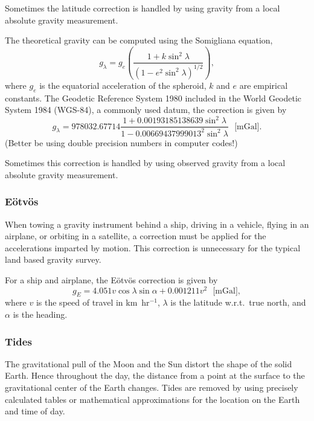 Sometimes the latitude correction is handled by using gravity from a local absolute gravity measurement.

The theoretical gravity can be computed using the Somigliana equation,
\begin{equation}
    g_{\lambda} = g_{e} \left( 
    \frac{1 + k \sin^{2} \lambda}{(1 - e^{2} \sin^{2} \lambda)^{1/2}} \right),
\end{equation}
where $g_{e}$ is the equatorial acceleration of the spheroid, $k$ and $e$ are empirical constants.  The Geodetic Reference System 1980 included in the World Geodetic System 1984 (WGS-84), a commonly used datum, the correction is given by
\begin{equation}
    g_{\lambda} = 978032.67714
    \frac{1 + 0.00193185138639 \sin^{2} \lambda}
    {1 - 0.00669437999013^2 \sin^{2} \lambda} \mbox{ $[$mGal$]$}.
\end{equation}
(Better be using double precision numbers in computer codes!)

Sometimes this correction is handled by using observed gravity from a local absolute gravity measurement.

\subsubsection{E{\"o}tv{\"o}s}
When towing a gravity instrument behind a ship, driving in a vehicle, flying in an airplane, or orbiting in a satellite, a correction must be applied for the accelerations imparted by motion.  This correction is unnecessary for the typical land based gravity survey.

For a ship and airplane, the E{\"o}tv{\"o}s correction is given by
\begin{equation}
    g_{E} = 4.051 v \cos \lambda \sin \alpha + 0.001211 v^{2} \mbox{ $[$mGal$]$},
\end{equation}
where $v$ is the speed of travel in km~hr$^{-1}$, $\lambda$ is the latitude w.r.t.\ true north, and $\alpha$ is the heading.

\subsubsection{Tides}
The gravitational pull of the Moon and the Sun distort the shape of the solid Earth.  Hence throughout the day, the distance from a point at the surface to the gravitational center of the Earth changes.  Tides are removed by using precisely calculated tables or mathematical approximations for the location on the Earth and time of day.

